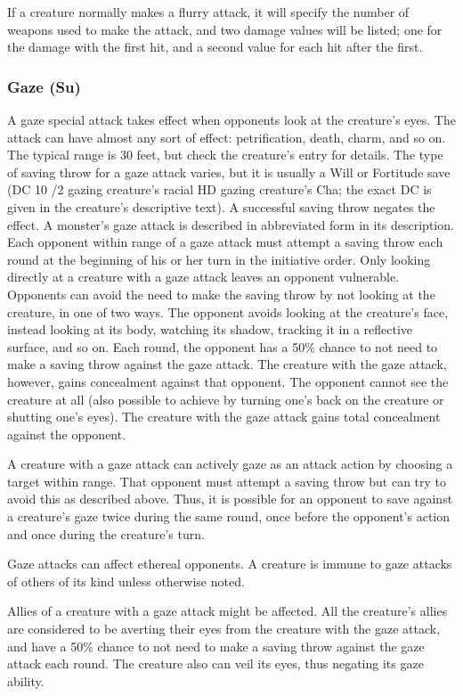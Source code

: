 {If a creature normally makes a flurry attack, it will specify the number of weapons used to make the attack, and two damage values will be listed; one for the damage with the first hit, and a second value for each hit after the first.


\subsubsection{Gaze (Su)} A gaze special attack takes effect when opponents look at the creature's eyes. The attack can have almost any sort of effect: petrification, death, charm, and so on. The typical range is 30 feet, but check the creature's entry for details. The type of saving throw for a gaze attack varies, but it is usually a Will or Fortitude save (DC 10 /2 gazing creature's racial HD \add gazing creature's Cha; the exact DC is given in the creature's descriptive text). A successful saving throw negates the effect. A monster's gaze attack is described in abbreviated form in its description. Each opponent within range of a gaze attack must attempt a saving throw each round at the beginning of his or her turn in the initiative order. Only looking directly at a creature with a gaze attack leaves an opponent vulnerable. Opponents can avoid the need to make the saving throw by not looking at the creature, in one of two ways. 
 The opponent avoids looking at the creature's face, instead looking at its body, watching its shadow, tracking it in a reflective surface, and so on. Each round, the opponent has a 50\% chance to not need to make a saving throw against the gaze attack. The creature with the gaze attack, however, gains concealment against that opponent.
 The opponent cannot see the creature at all (also possible to achieve by turning one's back on the creature or shutting one's eyes). The creature with the gaze attack gains total concealment against the opponent. 
\par A creature with a gaze attack can actively gaze as an attack action by choosing a target within range. That opponent must attempt a saving throw but can try to avoid this as described above. Thus, it is possible for an opponent to save against a creature's gaze twice during the same round, once before the opponent's action and once during the creature's turn. 
\par Gaze attacks can affect ethereal opponents. A creature is immune to gaze attacks of others of its kind unless otherwise noted.
\par Allies of a creature with a gaze attack might be affected. All the creature's allies are considered to be averting their eyes from the creature with the gaze attack, and have a 50\% chance to not need to make a saving throw against the gaze attack each round. The creature also can veil its eyes, thus negating its gaze ability.

}

